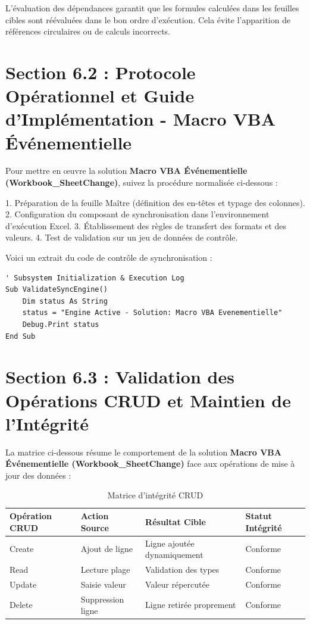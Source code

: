 \documentclass[12pt,a4paper]{report}
\begin{document}
L'évaluation des dépendances garantit que les formules calculées dans les feuilles cibles sont réévaluées dans le bon ordre d'exécution. Cela évite l'apparition de références circulaires ou de calculs incorrects.


\section{Section 6.2 : Protocole Opérationnel et Guide d'Implémentation - Macro VBA Événementielle}
Pour mettre en œuvre la solution \textbf{Macro VBA Événementielle (Workbook\_SheetChange)}, suivez la procédure normalisée ci-dessous :

1. Préparation de la feuille Maître (définition des en-têtes et typage des colonnes).
2. Configuration du composant de synchronisation dans l'environnement d'exécution Excel.
3. Établissement des règles de transfert des formats et des valeurs.
4. Test de validation sur un jeu de données de contrôle.

Voici un extrait du code de contrôle de synchronisation :
\begin{lstlisting}[caption=Code de controle operationnel]
' Subsystem Initialization & Execution Log
Sub ValidateSyncEngine()
    Dim status As String
    status = "Engine Active - Solution: Macro VBA Evenementielle"
    Debug.Print status
End Sub
\end{lstlisting}


\section{Section 6.3 : Validation des Opérations CRUD et Maintien de l'Intégrité}
La matrice ci-dessous résume le comportement de la solution \textbf{Macro VBA Événementielle (Workbook\_SheetChange)} face aux opérations de mise à jour des données :

\begin{table}[h]
\centering
\begin{tabular}{@{}llll@{}}
\toprule
\textbf{Opération CRUD} & \textbf{Action Source} & \textbf{Résultat Cible} & \textbf{Statut Intégrité} \\ \midrule
Create & Ajout de ligne & Ligne ajoutée dynamiquement & Conforme \\
Read & Lecture plage & Validation des types & Conforme \\
Update & Saisie valeur & Valeur répercutée & Conforme \\
Delete & Suppression ligne & Ligne retirée proprement & Conforme \\ \bottomrule
\end{tabular}
\caption{Matrice d'intégrité CRUD}
\end{table}
\end{document}
